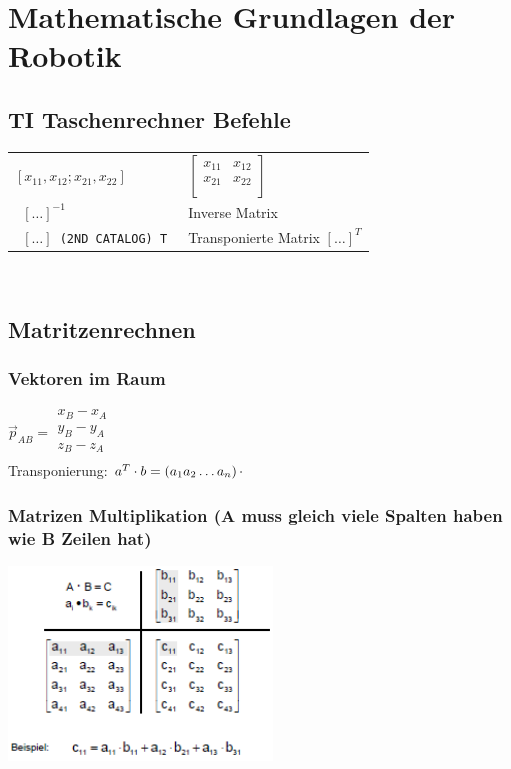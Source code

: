 \section{Mathematische Grundlagen der Robotik}

	\subsection{TI Taschenrechner Befehle}
\begin{tabular}{p{5cm}p{10cm}}

\texttt{$[ x_{11} , x_{12} ; x_{21},x_{22}]$} &  $ \begin{bmatrix}
            	x_{11} & x_{12}\\
            	x_{21} & x_{22}\\
            \end{bmatrix} $ \\
\texttt{ $[ \ldots]^{-1} $} & Inverse Matrix\\
\texttt{ $[ \ldots] $ (2ND CATALOG) \small{T} } & Transponierte Matrix
$[\ldots]^{T}$\\

\end{tabular} \\
	

	\subsection{Matritzenrechnen}
		\subsubsection{Vektoren im Raum}
			$\vec{p}_{AB}=
			\begin{matrix}
            	x_B-x_A\\
            	y_B-y_A\\
            	z_B-z_A\\
            \end{matrix}$\\
			
			Transponierung: $a^T\cdot b= \left(a_1 \vspace{0.2cm} a_2\vspace{0.2cm}  \ldots a_n \right) 
			\cdot $
	
		\subsubsection{Matrizen Multiplikation \small{(A muss gleich viele Spalten
		haben wie B Zeilen hat)}}
		\includegraphics[width=7cm]{./bilder/matrizenmultiplikation.png}
    	
